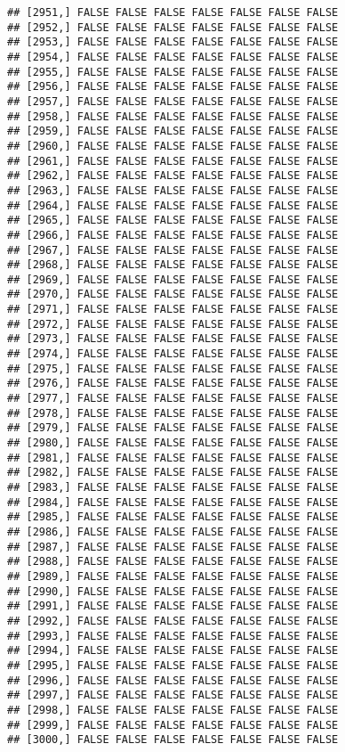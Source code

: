\documentclass[
]{article}
\begin{document}
\begin{verbatim}
## [2951,] FALSE FALSE FALSE FALSE FALSE FALSE FALSE
## [2952,] FALSE FALSE FALSE FALSE FALSE FALSE FALSE
## [2953,] FALSE FALSE FALSE FALSE FALSE FALSE FALSE
## [2954,] FALSE FALSE FALSE FALSE FALSE FALSE FALSE
## [2955,] FALSE FALSE FALSE FALSE FALSE FALSE FALSE
## [2956,] FALSE FALSE FALSE FALSE FALSE FALSE FALSE
## [2957,] FALSE FALSE FALSE FALSE FALSE FALSE FALSE
## [2958,] FALSE FALSE FALSE FALSE FALSE FALSE FALSE
## [2959,] FALSE FALSE FALSE FALSE FALSE FALSE FALSE
## [2960,] FALSE FALSE FALSE FALSE FALSE FALSE FALSE
## [2961,] FALSE FALSE FALSE FALSE FALSE FALSE FALSE
## [2962,] FALSE FALSE FALSE FALSE FALSE FALSE FALSE
## [2963,] FALSE FALSE FALSE FALSE FALSE FALSE FALSE
## [2964,] FALSE FALSE FALSE FALSE FALSE FALSE FALSE
## [2965,] FALSE FALSE FALSE FALSE FALSE FALSE FALSE
## [2966,] FALSE FALSE FALSE FALSE FALSE FALSE FALSE
## [2967,] FALSE FALSE FALSE FALSE FALSE FALSE FALSE
## [2968,] FALSE FALSE FALSE FALSE FALSE FALSE FALSE
## [2969,] FALSE FALSE FALSE FALSE FALSE FALSE FALSE
## [2970,] FALSE FALSE FALSE FALSE FALSE FALSE FALSE
## [2971,] FALSE FALSE FALSE FALSE FALSE FALSE FALSE
## [2972,] FALSE FALSE FALSE FALSE FALSE FALSE FALSE
## [2973,] FALSE FALSE FALSE FALSE FALSE FALSE FALSE
## [2974,] FALSE FALSE FALSE FALSE FALSE FALSE FALSE
## [2975,] FALSE FALSE FALSE FALSE FALSE FALSE FALSE
## [2976,] FALSE FALSE FALSE FALSE FALSE FALSE FALSE
## [2977,] FALSE FALSE FALSE FALSE FALSE FALSE FALSE
## [2978,] FALSE FALSE FALSE FALSE FALSE FALSE FALSE
## [2979,] FALSE FALSE FALSE FALSE FALSE FALSE FALSE
## [2980,] FALSE FALSE FALSE FALSE FALSE FALSE FALSE
## [2981,] FALSE FALSE FALSE FALSE FALSE FALSE FALSE
## [2982,] FALSE FALSE FALSE FALSE FALSE FALSE FALSE
## [2983,] FALSE FALSE FALSE FALSE FALSE FALSE FALSE
## [2984,] FALSE FALSE FALSE FALSE FALSE FALSE FALSE
## [2985,] FALSE FALSE FALSE FALSE FALSE FALSE FALSE
## [2986,] FALSE FALSE FALSE FALSE FALSE FALSE FALSE
## [2987,] FALSE FALSE FALSE FALSE FALSE FALSE FALSE
## [2988,] FALSE FALSE FALSE FALSE FALSE FALSE FALSE
## [2989,] FALSE FALSE FALSE FALSE FALSE FALSE FALSE
## [2990,] FALSE FALSE FALSE FALSE FALSE FALSE FALSE
## [2991,] FALSE FALSE FALSE FALSE FALSE FALSE FALSE
## [2992,] FALSE FALSE FALSE FALSE FALSE FALSE FALSE
## [2993,] FALSE FALSE FALSE FALSE FALSE FALSE FALSE
## [2994,] FALSE FALSE FALSE FALSE FALSE FALSE FALSE
## [2995,] FALSE FALSE FALSE FALSE FALSE FALSE FALSE
## [2996,] FALSE FALSE FALSE FALSE FALSE FALSE FALSE
## [2997,] FALSE FALSE FALSE FALSE FALSE FALSE FALSE
## [2998,] FALSE FALSE FALSE FALSE FALSE FALSE FALSE
## [2999,] FALSE FALSE FALSE FALSE FALSE FALSE FALSE
## [3000,] FALSE FALSE FALSE FALSE FALSE FALSE FALSE

\end{verbatim}
\end{document}
